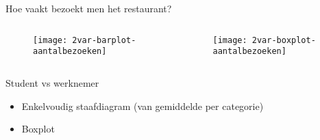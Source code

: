 \documentclass[aspectratio=169]{beamer}
\begin{document}
\begin{frame}{Hoe vaakt bezoekt men het restaurant?}
  
  \begin{columns}
    
    \begin{column}{0.5\textwidth}
      \begin{figure}
        \centering
        \texttt{[image: 2var-barplot-aantalbezoeken]}
        \label{fig:studentenbar}
      \end{figure}
    \end{column}
    
    \begin{column}{0.5\textwidth}
      \begin{figure}
        \centering
        \texttt{[image: 2var-boxplot-aantalbezoeken]}
        \label{fig:boxplotStudenten2}
      \end{figure}
    \end{column}
    
  \end{columns}
\end{frame}

\begin{frame}{Student vs werknemer}
  
  \begin{itemize}
    \item \alert<1>{Enkelvoudig staafdiagram} (van gemiddelde per categorie)
    \item \alert<2>{Boxplot}
  \end{itemize}
  
  \begin{figure}
    \centering
  \end{figure}
  
\end{frame}
\end{document}
